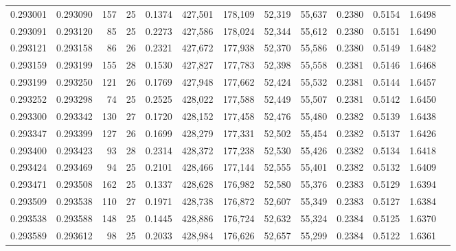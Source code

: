 \begin{tabular}{rrrrrrrrrrrrr}
0.293001 & 0.293090 &   157 &  25 &                                     0.1374 & 427,501 & 178,109 &  52,319 &  55,637 & 0.2380 & 0.5154 & 1.6498 \\
0.293091 & 0.293120 &    85 &  25 &                                     0.2273 & 427,586 & 178,024 &  52,344 &  55,612 & 0.2380 & 0.5151 & 1.6490 \\
0.293121 & 0.293158 &    86 &  26 &                                     0.2321 & 427,672 & 177,938 &  52,370 &  55,586 & 0.2380 & 0.5149 & 1.6482 \\
0.293159 & 0.293199 &   155 &  28 &                                     0.1530 & 427,827 & 177,783 &  52,398 &  55,558 & 0.2381 & 0.5146 & 1.6468 \\
0.293199 & 0.293250 &   121 &  26 &                                     0.1769 & 427,948 & 177,662 &  52,424 &  55,532 & 0.2381 & 0.5144 & 1.6457 \\
0.293252 & 0.293298 &    74 &  25 &                                     0.2525 & 428,022 & 177,588 &  52,449 &  55,507 & 0.2381 & 0.5142 & 1.6450 \\
0.293300 & 0.293342 &   130 &  27 &                                     0.1720 & 428,152 & 177,458 &  52,476 &  55,480 & 0.2382 & 0.5139 & 1.6438 \\
0.293347 & 0.293399 &   127 &  26 &                                     0.1699 & 428,279 & 177,331 &  52,502 &  55,454 & 0.2382 & 0.5137 & 1.6426 \\
0.293400 & 0.293423 &    93 &  28 &                                     0.2314 & 428,372 & 177,238 &  52,530 &  55,426 & 0.2382 & 0.5134 & 1.6418 \\
0.293424 & 0.293469 &    94 &  25 &                                     0.2101 & 428,466 & 177,144 &  52,555 &  55,401 & 0.2382 & 0.5132 & 1.6409 \\
0.293471 & 0.293508 &   162 &  25 &                                     0.1337 & 428,628 & 176,982 &  52,580 &  55,376 & 0.2383 & 0.5129 & 1.6394 \\
0.293509 & 0.293538 &   110 &  27 &                                     0.1971 & 428,738 & 176,872 &  52,607 &  55,349 & 0.2383 & 0.5127 & 1.6384 \\
0.293538 & 0.293588 &   148 &  25 &                                     0.1445 & 428,886 & 176,724 &  52,632 &  55,324 & 0.2384 & 0.5125 & 1.6370 \\
0.293589 & 0.293612 &    98 &  25 &                                     0.2033 & 428,984 & 176,626 &  52,657 &  55,299 & 0.2384 & 0.5122 & 1.6361 \\

\end{tabular}
